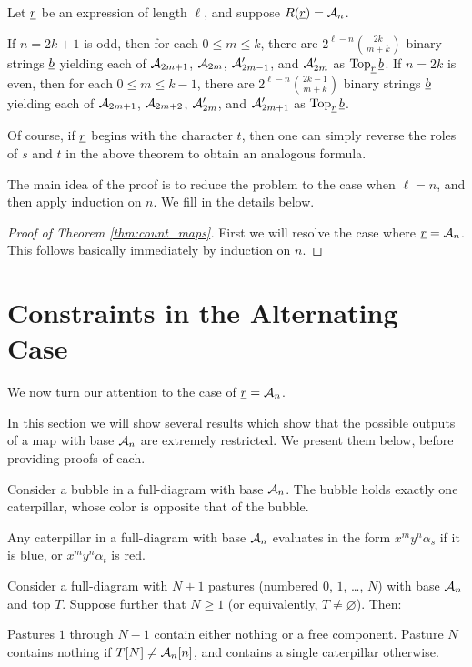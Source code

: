 \begin{theorem}
	Let $\ul r$ be an expression of length $\ell$, and suppose $R(\ul r) = \AA_n$.
	\begin{enumerate}
		\ii If $n=2k+1$ is odd, then for each $0 \le m \le k$, there are $2^{\ell-n} \binom{2k}{m+k}$ binary strings $\ul b$ yielding each of $\AA_{2m+1}$, $\AA_{2m}$, $\AA_{2m-1}'$, and $\AA_{2m}'$ as $\Top_{\ul r} \ul b$.
		\ii If $n=2k$ is even, then for each $0 \le m \le k-1$, there are $2^{\ell-n} \binom{2k-1}{m+k}$ binary strings $\ul b$ yielding each of $\AA_{2m+1}$, $\AA_{2m+2}$, $\AA_{2m}'$, and $\AA_{2m+1}'$ as $\Top_{\ul r} \ul b$.
	\end{enumerate}
	\label{thm:count_maps}
\end{theorem}
Of course, if $\ul r$ begins with the character $t$, then one can simply reverse the roles of $s$ and $t$ in the above theorem to obtain an analogous formula.

The main idea of the proof is to reduce the problem to the case when $\ell = n$, and then apply induction on $n$.  We fill in the details below.

\begin{proof}[Proof of Theorem \ref{thm:count_maps}]
	First we will resolve the case where $\ul r = \AA_n$.  This follows basically immediately by induction on $n$.  
\end{proof}


\section{Constraints in the Alternating Case}
We now turn our attention to the case of $\ul r = \AA_n$.

In this section we will show several results which show that the possible outputs of a map with base $\AA_n$ are extremely restricted.  We present them below, before providing proofs of each.
\begin{theorem}
	Consider a bubble in a full-diagram with base $\AA_n$.  The bubble holds exactly one caterpillar, whose color is opposite that of the bubble.
	\label{thm:bubble}
\end{theorem}
\begin{theorem}
	Any caterpillar in a full-diagram with base $\AA_n$ evaluates in the form $x^my^n\alpha_s$ if it is blue, or $x^my^n\alpha_t$ is red.
	\label{thm:caterpillar}
\end{theorem}
\begin{theorem}
	Consider a full-diagram with $N+1$ pastures (numbered $0$, $1$, \dots, $N$) with base $\AA_n$ and top $T$.  Suppose further that $N \ge 1$ (or equivalently, $T \neq \varnothing$).  Then:
	\begin{enumerate}[(i)]
		\ii Pastures $1$ through $N-1$ contain either nothing or a free component.
		\ii Pasture $N$ contains nothing if $T[N] \neq \AA_n[n]$, and contains a single caterpillar otherwise.
	\end{enumerate}
	\label{thm:pasture}
\end{theorem}

